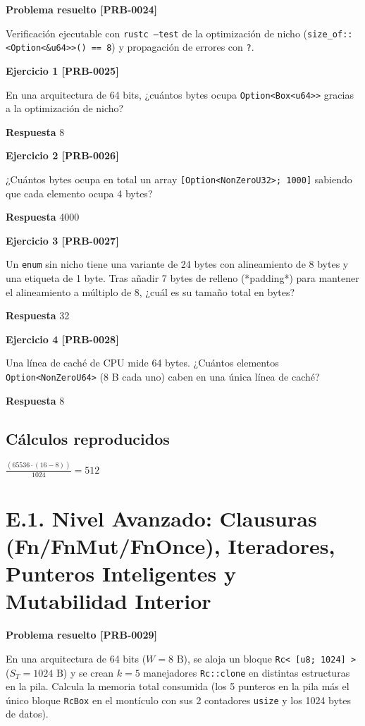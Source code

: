 \documentclass{book}
\begin{document}
\noindent\textbf{Problema resuelto [PRB-0024]}

Verificación ejecutable con \texttt{rustc --test} de la optimización de nicho (\texttt{size\_of::<Option<\&u64>>() == 8}) y propagación de errores con \texttt{?}.

\noindent\textbf{Ejercicio 1 [PRB-0025]}

En una arquitectura de 64 bits, ¿cuántos bytes ocupa \texttt{Option<Box<u64>>} gracias a la optimización de nicho?

\noindent\textbf{Respuesta} 8

\noindent\textbf{Ejercicio 2 [PRB-0026]}

¿Cuántos bytes ocupa en total un array \texttt{[Option<NonZeroU32>; 1000]} sabiendo que cada elemento ocupa 4 bytes?

\noindent\textbf{Respuesta} 4000

\noindent\textbf{Ejercicio 3 [PRB-0027]}

Un \texttt{enum} sin nicho tiene una variante de 24 bytes con alineamiento de 8 bytes y una etiqueta de 1 byte. Tras añadir 7 bytes de relleno (*padding*) para mantener el alineamiento a múltiplo de 8, ¿cuál es su tamaño total en bytes?

\noindent\textbf{Respuesta} 32

\noindent\textbf{Ejercicio 4 [PRB-0028]}

Una línea de caché de CPU mide 64 bytes. ¿Cuántos elementos \texttt{Option<NonZeroU64>} (8 B cada uno) caben en una única línea de caché?

\noindent\textbf{Respuesta} 8

\subsection*{Cálculos reproducidos}

\(\frac{\left(65536\cdot \left(16-8\right)\right)}{1024} = 512\)

\section{E.1. Nivel Avanzado: Clausuras (Fn/FnMut/FnOnce), Iteradores, Punteros Inteligentes y Mutabilidad Interior}

\noindent\textbf{Problema resuelto [PRB-0029]}

En una arquitectura de 64 bits (\(W = 8\text{ B}\)), se aloja un bloque \texttt{Rc< [u8; 1024] >} (\(S_T = 1024\text{ B}\)) y se crean \(k = 5\) manejadores \texttt{Rc::clone} en distintas estructuras en la pila. Calcula la memoria total consumida (los 5 punteros en la pila más el único bloque \texttt{RcBox} en el montículo con sus 2 contadores \texttt{usize} y los 1024 bytes de datos).
\end{document}
